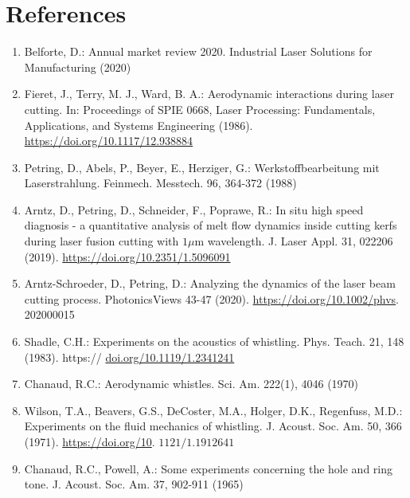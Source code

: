\documentclass[10pt]{article}
\begin{document}
\section*{References}
\begin{enumerate}
  \item Belforte, D.: Annual market review 2020. Industrial Laser Solutions for Manufacturing (2020)

  \item Fieret, J., Terry, M. J., Ward, B. A.: Aerodynamic interactions during laser cutting. In: Proceedings of SPIE 0668, Laser Processing: Fundamentals, Applications, and Systems Engineering (1986). \href{https://doi.org/10.1117/12.938884}{https://doi.org/10.1117/12.938884}

  \item Petring, D., Abels, P., Beyer, E., Herziger, G.: Werkstoffbearbeitung mit Laserstrahlung. Feinmech. Messtech. 96, 364-372 (1988)

  \item Arntz, D., Petring, D., Schneider, F., Poprawe, R.: In situ high speed diagnosis - a quantitative analysis of melt flow dynamics inside cutting kerfs during laser fusion cutting with $1 \mu \mathrm{m}$ wavelength. J. Laser Appl. 31, 022206 (2019). \href{https://doi.org/10.2351/1.5096091}{https://doi.org/10.2351/1.5096091}

  \item Arntz-Schroeder, D., Petring, D.: Analyzing the dynamics of the laser beam cutting process. PhotonicsViews 43-47 (2020). \href{https://doi.org/10.1002/phvs}{https://doi.org/10.1002/phvs}. 202000015

  \item Shadle, C.H.: Experiments on the acoustics of whistling. Phys. Teach. 21, 148 (1983). https:// \href{http://doi.org/10.1119/1.2341241}{doi.org/10.1119/1.2341241}

  \item Chanaud, R.C.: Aerodynamic whistles. Sci. Am. 222(1), 4046 (1970)

  \item Wilson, T.A., Beavers, G.S., DeCoster, M.A., Holger, D.K., Regenfuss, M.D.: Experiments on the fluid mechanics of whistling. J. Acoust. Soc. Am. 50, 366 (1971). \href{https://doi.org/10}{https://doi.org/10}. $1121 / 1.1912641$

  \item Chanaud, R.C., Powell, A.: Some experiments concerning the hole and ring tone. J. Acoust. Soc. Am. 37, 902-911 (1965)


\end{enumerate}
\end{document}
